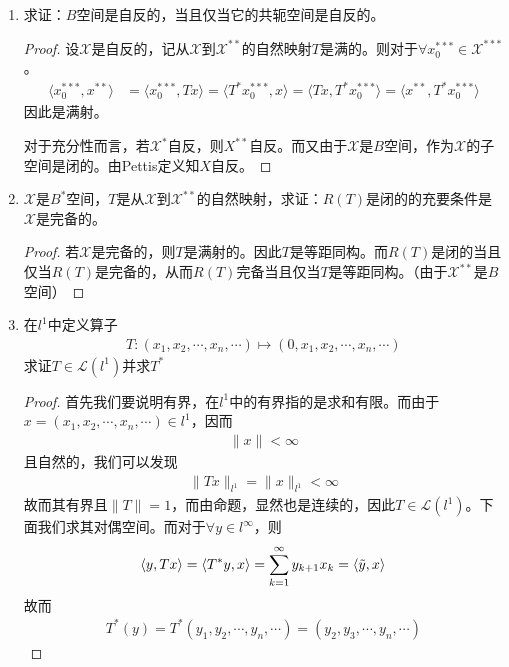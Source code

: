 \begin{enumerate}[leftmargin=2cm, label=\arabic*]
\begin{proof}
			因此
			\begin{align*}
				x^{**} = \sum\limits_{i=1}^n x^{**}(f_i)  e_i 
			\end{align*}
			因此从$\mathscr{X}$到$\mathscr{X}^{**}$的自然映射是满的，因此是自反的。
		\end{proof}
		
		\item 求证：$B$空间是自反的，当且仅当它的共轭空间是自反的。
		\begin{proof}
			设$\mathscr{X}$是自反的，记从$\mathscr{X}$到$\mathscr{X}^{**}$的自然映射$T$是满的。则对于$\forall x_0^{***}\in\mathscr{X}^{***}$。
			\begin{align*}
				\langle x_0^{***}, x^{**}\rangle &= \langle x_0^{***}, Tx\rangle = \langle T^* x_0^{***}, x\rangle = \langle Tx,T^*x_0^{***} \rangle =  \langle x^{**},T^*x_0^{***}\rangle 
			\end{align*}
			因此是满射。
			
			对于充分性而言，若$\mathscr{X}^*$自反，则$X^{**}$自反。而又由于$\mathscr{X}$是$B$空间，作为$\mathscr{X}$的子空间是闭的。由Pettis定义知$X$自反。
		\end{proof}
		
		\item $\mathscr{X}$是$B^*$空间，$T$是从$\mathscr{X}$到$\mathscr{X}^{**}$的自然映射，求证：$R(T)$是闭的的充要条件是$\mathscr{X}$是完备的。
		\begin{proof}
			若$\mathscr{X}$是完备的，则$T$是满射的。因此$T$是等距同构。而$R(T)$是闭的当且仅当$R(T)$是完备的，从而$R(T)$完备当且仅当$T$是等距同构。（由于$\mathscr{X}^{**}$是$B$空间）
		\end{proof}
		
		\item 在$l^1$中定义算子
		\begin{align*}
			T:(x_1,x_2,\cdots,x_n,\cdots) \mapsto (0,x_1,x_2,\cdots,x_n,\cdots)
		\end{align*}
		求证$T\in\mathscr{L}(l^1)$并求$T^*$
		\begin{proof}
			首先我们要说明有界，在$l^1$中的有界指的是求和有限。而由于$x = (x_1,x_2,\cdots,x_n,\cdots)\in l^1$，因而
			\begin{align*}
				\|x\| < \infty
			\end{align*}
			且自然的，我们可以发现
			\begin{align*}
				\|Tx\|_{l^1} = \|x\|_{l^1} < \infty
			\end{align*}
			故而其有界且$\|T\| = 1$，而由命题，显然也是连续的，因此$T\in\mathscr{L}(l^1)$。下面我们求其对偶空间。而对于$\forall y\in l^{\infty}$，则
			\begin{align*}
				\langle y, Tx \rangle = \langle T^*y, x\rangle = \sum\limits_{k=1}^{\infty} y_{k+1} x_k = \langle \Tilde{y}, x \rangle
			\end{align*}
			故而
			\begin{align*}
				T^* (y) = T^*(y_1,y_2,\cdots,y_n,\cdots) = (y_2,y_3,\cdots,y_n,\cdots)
			\end{align*}
		\end{proof}
		

\end{enumerate}
